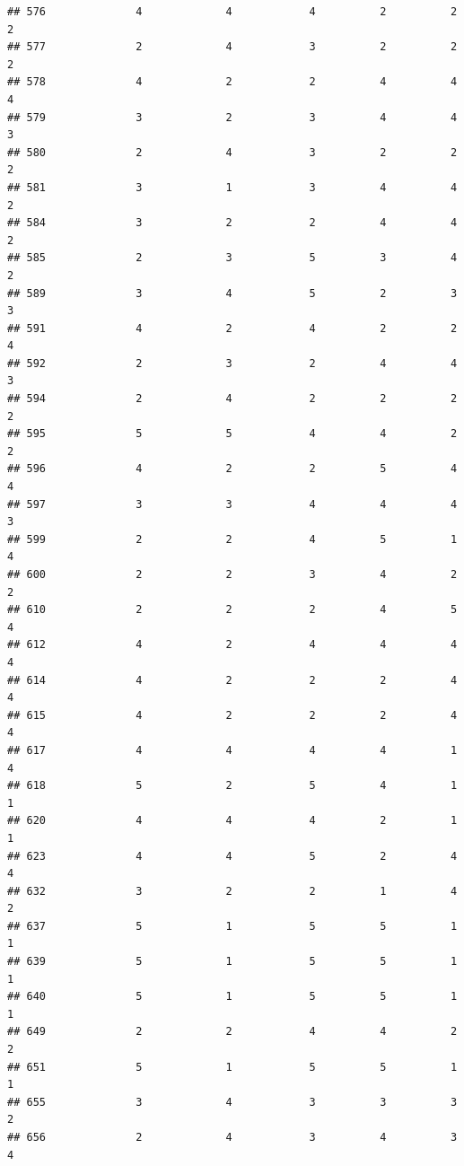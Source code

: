 \documentclass[
]{article}
\begin{document}
\begin{verbatim}
## 576              4             4            4          2          2        2
## 577              2             4            3          2          2        2
## 578              4             2            2          4          4        4
## 579              3             2            3          4          4        3
## 580              2             4            3          2          2        2
## 581              3             1            3          4          4        2
## 584              3             2            2          4          4        2
## 585              2             3            5          3          4        2
## 589              3             4            5          2          3        3
## 591              4             2            4          2          2        4
## 592              2             3            2          4          4        3
## 594              2             4            2          2          2        2
## 595              5             5            4          4          2        2
## 596              4             2            2          5          4        4
## 597              3             3            4          4          4        3
## 599              2             2            4          5          1        4
## 600              2             2            3          4          2        2
## 610              2             2            2          4          5        4
## 612              4             2            4          4          4        4
## 614              4             2            2          2          4        4
## 615              4             2            2          2          4        4
## 617              4             4            4          4          1        4
## 618              5             2            5          4          1        1
## 620              4             4            4          2          1        1
## 623              4             4            5          2          4        4
## 632              3             2            2          1          4        2
## 637              5             1            5          5          1        1
## 639              5             1            5          5          1        1
## 640              5             1            5          5          1        1
## 649              2             2            4          4          2        2
## 651              5             1            5          5          1        1
## 655              3             4            3          3          3        2
## 656              2             4            3          4          3        4

\end{verbatim}
\end{document}

